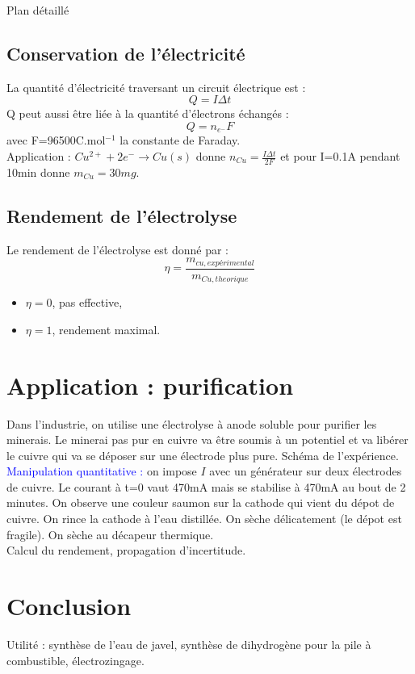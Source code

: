 \begin{reportBlock}{Plan détaillé}
\subsection{Conservation de l'électricité}
La quantité d'électricité traversant un circuit électrique est :
\begin{equation}
    Q = I\Delta t
\end{equation}
Q peut aussi être liée à la quantité d'électrons échangés :
\begin{equation}
    Q = n_{e^-}F
\end{equation}
avec F=96500C.mol$^{-1}$ la constante de Faraday.\\

Application : $Cu^{2+}+2e^- \rightarrow Cu(s)$ donne $n_{Cu}=\frac{I\Delta t}{2F}$ et pour I=0.1A pendant 10min donne $m_{Cu}=30mg$.

\subsection{Rendement de l'électrolyse}
Le rendement de l'électrolyse est donné par :
\begin{equation}
    \eta = \frac{m_{cu,expérimental}}{m_{Cu,theorique}}
\end{equation}
\begin{itemize}
    \item $\eta=0$, pas effective,
    \item $\eta=1$, rendement maximal.
\end{itemize}

\section{Application : purification}
Dans l'industrie, on utilise une électrolyse à anode soluble pour purifier les minerais. Le minerai pas pur en cuivre va être soumis à un potentiel et va libérer le cuivre qui va se déposer sur une électrode plus pure. Schéma de l'expérience.\\

\textcolor{blue}{Manipulation quantitative :} on impose $I$ avec un générateur sur deux électrodes de cuivre. Le courant à t=0 vaut 470mA mais se stabilise à 470mA au bout de 2 minutes. On observe une couleur saumon sur la cathode qui vient du dépot de cuivre. On rince la cathode à l'eau distillée. On sèche délicatement (le dépot est fragile). On sèche au décapeur thermique.\\

Calcul du rendement, propagation d'incertitude.

\section*{Conclusion} 
Utilité : synthèse de l'eau de javel, synthèse de dihydrogène pour la pile à combustible, électrozingage.
\end{reportBlock}